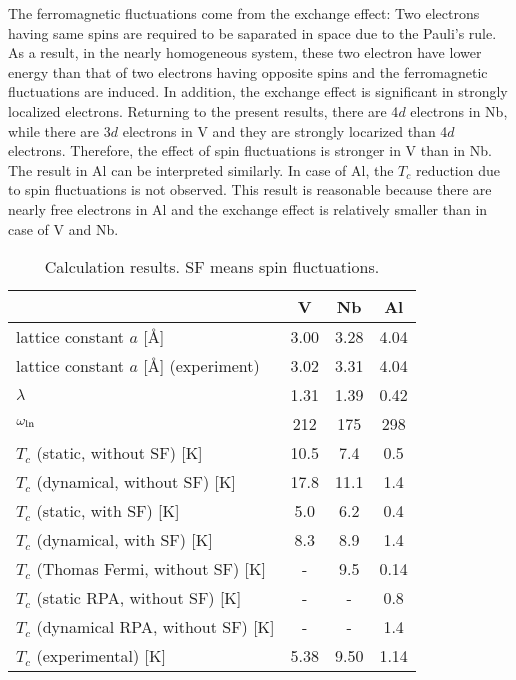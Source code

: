 The ferromagnetic fluctuations come from the exchange effect\cite{Berk1966}: Two electrons having same spins are 
required to be saparated in space due to the Pauli's rule. As a result, in the 
nearly homogeneous system, these two electron have lower energy than that of two electrons having 
opposite spins and the ferromagnetic fluctuations are induced.
In addition, the exchange effect is significant in strongly localized electrons.
Returning to the present results, there are 4$d$ electrons in Nb, while there are 3$d$ electrons 
in V and they are strongly locarized than 4$d$ electrons. Therefore, the effect of spin fluctuations
is stronger in V than in Nb.
The result in Al can be interpreted similarly. In case of Al, the $T_c$ reduction due to spin fluctuations
is not observed. This result is reasonable because there are nearly free electrons in Al and the
exchange effect is relatively smaller than in case of V and Nb.
%
\begin{table}[htbp]
	\centering
	\caption{Calculation results. SF means spin fluctuations.} 
	\begin{tabular}{lccc}
		\hline \hline
		& V & Nb & Al \\
		\hline
		lattice constant $a$ [\AA] & 3.00 & 3.28 & 4.04 \\
		lattice constant $a$ [\AA] (experiment) & 3.02\cite{Kuentzler1985} & 3.31\cite{Laesser1985} & 4.04\cite{Sumiyama1990} \\
		\hline
		$\lambda$ & 1.31 & 1.39 & 0.42 \\
		$\omega_{\rm ln}$ & 212 & 175 & 298 \\
		\hline
		$T_c$ (static, without SF) [K] & 10.5 & 7.4 & 0.5 \\
		$T_c$ (dynamical, without SF) [K] & 17.8 & 11.1 & 1.4 \\
		$T_c$ (static, with SF) [K] & 5.0 & 6.2 & 0.4 \\
		$T_c$ (dynamical, with SF) [K] & 8.3 & 8.9 & 1.4 \\
		$T_c$ (Thomas Fermi, without SF) [K] & - & 9.5\cite{Luders2005} & 0.14\cite{Luders2005} \\
		$T_c$ (static RPA, without SF) [K] & - & - & 0.8\cite{RA2013} \\
		$T_c$ (dynamical RPA, without SF) [K] & - & - & 1.4\cite{RA2013} \\
		$T_c$ (experimental)\cite{Ashcroft} [K] & 5.38 & 9.50 & 1.14 \\
		\hline \hline
	\end{tabular}
	\label{tab:results}
\end{table}
%

